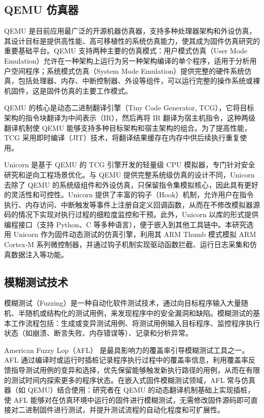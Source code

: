\subsection{QEMU 仿真器}

QEMU\cite{qemu} 是目前应用最广泛的开源机器仿真器，支持多种处理器架构和外设仿真，其设计目标是提供高性能、高可移植性的系统仿真能力，使其成为固件仿真研究的重要基础平台。QEMU 支持两种主要的仿真模式：用户模式仿真（User Mode Emulation）允许在一种架构上运行为另一种架构编译的单个程序，适用于分析用户空间程序；系统模式仿真（System Mode Emulation）提供完整的硬件系统仿真，包括处理器、内存、中断控制器、外设等组件，可以运行完整的操作系统或裸机固件，这是固件仿真的主要工作模式。

QEMU 的核心是动态二进制翻译引擎（Tiny Code Generator, TCG），它将目标架构的指令块翻译为中间表示（IR），然后再将 IR 翻译为宿主机指令，这种两级翻译机制使 QEMU 能够支持多种目标架构和宿主架构的组合。为了提高性能，TCG 采用即时编译（JIT）技术，将翻译结果缓存在内存中供后续执行重复使用。

Unicorn\cite{unicorn} 是基于 QEMU 的 TCG 引擎开发的轻量级 CPU 模拟器，专门针对安全研究和逆向工程场景优化。与 QEMU 提供完整系统级仿真的设计不同，Unicorn 去除了 QEMU 的系统级组件和外设仿真，只保留指令集模拟核心，因此具有更好的灵活性和可控性。Unicorn 提供了丰富的钩子（Hook）机制，允许用户在指令执行、内存访问、中断触发等事件上注册自定义回调函数，从而在不修改模拟器源码的情况下实现对执行过程的细粒度监控和干预。此外，Unicorn 以库的形式提供编程接口（支持 Python、C 等多种语言），便于嵌入到其他工具链中。本研究选用 Unicorn 作为固件动态测试的仿真引擎，利用其 ARM Thumb 模式模拟 ARM Cortex-M 系列微控制器，并通过钩子机制实现驱动函数拦截、运行日志采集和仿真数据注入等功能。



\subsection{模糊测试技术}

模糊测试（Fuzzing）是一种自动化软件测试技术，通过向目标程序输入大量随机、半随机或结构化的测试用例，来发现程序中的安全漏洞和缺陷\cite{manesArtScienceEngineering2021}。模糊测试的基本工作流程包括：生成或变异测试用例、将测试用例输入目标程序、监控程序执行状态（如崩溃、断言失败、内存错误等）、记录和分析异常。

American Fuzzy Lop（AFL）\cite{aflplusplus_paper} 是最具影响力的覆盖率引导模糊测试工具之一。AFL 通过编译时或运行时插桩记录程序执行过程中的覆盖率信息，利用覆盖率反馈指导测试用例的变异和选择，优先保留能够触发新执行路径的用例，从而在有限的测试时间内探索更多的程序状态。在嵌入式固件模糊测试领域，AFL 常与仿真器（如 QEMU）结合使用：研究者在 QEMU 的动态翻译机制基础上实现插桩，使 AFL 能够对在仿真环境中运行的固件进行模糊测试，无需修改固件源码即可直接对二进制固件进行测试，并提升测试流程的自动化程度和可扩展性。

